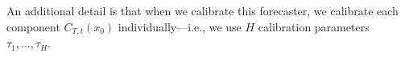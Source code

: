 \documentclass{article} \usepackage{iclr2020_conference,times}
\renewcommand{\(}						{\left(}
\renewcommand{\)}						{\right)}
\renewcommand{\[}						{\left[}
\renewcommand{\]}						{\right]}
\newcommand{\<}						{\left<}
\renewcommand{\>}						{\right>}
\def\fh{\hat{{f}}}
\def\hh{\hat{{h}}}
\begin{document}
An additional detail is that when we calibrate this forecaster, we calibrate each component $C_{T,t}(x_0)$ individually---i.e., we use $H$ calibration parameters $\tau_1,...,\tau_H$.

\begin{comment}

Our goal is to obtain a confidence set for subsequent states from the initial state $x_0$ by the dynamics $h^{*}$. If we only consider one-step predictions $\hh(x_{t}\mid x_{t-1})$, then this setting reduces to the regression setting with labels $\mathcal{Y}=\mathcal{X}$. However, we are interested in the multi-step prediction setting. We use $h_{t}^*(x_{1:t} \mid x_0)$ to denote the true distribution of states after $t$ steps --- i.e., $h_{t}^*(x_{1:t} \mid x_0) = \prod_{t=1}^{H} h^{*}(x_t \mid x_{0:t-1})$.
We can define the predicted distribution $\hh_{t}(x_{1:t} \mid x_0)$ of states after $t$ steps in the same way. In principle, the multi-step setting is still a regression problem. The key difference is that it is in general intractable to compute $\hh_t(x _t \mid x_{0:t-1})$ in closed form due to its long state dependency.
Instead, we use a heuristic to estimate this distribution. In particular, we use a Gaussian distribution 
$\tilde{h}_t(x_{t}\mid x_{0:t-1}) = \mathcal{N}(x_{t} ; \tilde{\mu}(x_{0:t-1}), \tilde{\Sigma}(x_{0:t-1}))$, 
where
$\tilde{\mu}(x_{0:t-1}) = \hat{\mu}(x_{t-1})$, and 
\begin{align}
\label{eqn:modelbased}
	\tilde{\Sigma}(x_{0:t-1})=\hat{\Sigma}(x_0)+ \dots + \hat{\Sigma}(x_{t-1}).
\end{align}
Thus, we use this predicted distribution $\tilde{h}_t$ as a probability forecaster $\fh$ to predict states after $H$ steps (i.e., $\fh(x_0) = \tilde{h}_H( x_{1:H} \mid x_0)$). Then, the problem of predicting confidence sets for a state trajectory $h_H^*(x_{1:H} \mid x_0)$ reduces to the case of regression.

We also consider model-based reinforcement learning, where the goal is to learn a model of the dynamics. In particular, we consider an MDP with states $\mathcal{X}$, actions $\mathcal{U}$, and unknown dynamics $g^*:\mathcal{X}\times\mathcal{U}\to\mathcal{X}$. In general, the goal is to learn a policy that achieves high performance according to some reward function, but in this paper we are interested in obtaining confidence sets on a learned model. Therefore, we assume given a fixed policy $\pi:\mathcal{X}\to\mathcal{U}$, and let $f^*:\mathcal{X}\to\mathcal{X}$ denote the closed-loop dynamics---i.e., $f^*(x)=g^*(x,\pi(x))$. Additionally, we consider the case where $g^*$ and $\pi$ may be stochastic, so $f^*(x'\mid x)$ actually encodes a probability distribution over the next state $x'$ given the current state $x$.


\end{comment}
\end{document}
